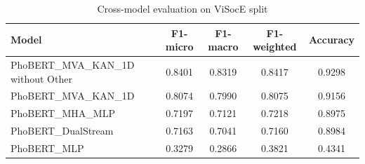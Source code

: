 \begin{table}[htbp]
\centering
\caption{Cross-model evaluation on ViSocE split}
\label{tab:final_results}
\begin{tabular}{lcccc}
\toprule
Model & F1-micro & F1-macro & F1-weighted & Accuracy \\
\midrule
PhoBERT_MVA_KAN_1D without Other & 0.8401 & 0.8319 & 0.8417 & 0.9298 \\
PhoBERT_MVA_KAN_1D & 0.8074 & 0.7990 & 0.8075 & 0.9156 \\
PhoBERT_MHA_MLP & 0.7197 & 0.7121 & 0.7218 & 0.8975 \\
PhoBERT_DualStream & 0.7163 & 0.7041 & 0.7160 & 0.8984 \\
PhoBERT_MLP & 0.3279 & 0.2866 & 0.3821 & 0.4341 \\
\bottomrule
\end{tabular}
\end{table}